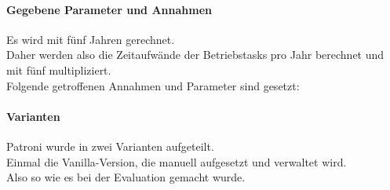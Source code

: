 
\begin{flushleft}
    \paragraph{Gegebene Parameter und Annahmen}
    Es wird mit fünf Jahren gerechnet.\\
    Daher werden also die Zeitaufwände der Betriebstasks pro Jahr berechnet und mit fünf multipliziert.\\
    Folgende getroffenen Annahmen und Parameter sind gesetzt:
    
    \paragraph{Varianten}
    Patroni wurde in zwei Varianten aufgeteilt.\\
    Einmal die Vanilla-Version, die manuell aufgesetzt und verwaltet wird.\\
    Also so wie es bei der Evaluation gemacht wurde.
\end{flushleft}
